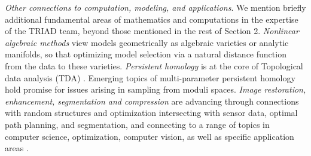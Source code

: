 \documentclass[12pt]{article}
\begin{document}


{\it Other connections to computation, modeling, and applications}.
We mention briefly additional fundamental areas of mathematics and computations in the expertise of the TRIAD team, beyond those mentioned in the rest of Section 2.  {\it Nonlinear algebraic methods} view
models geometrically as algebraic varieties or analytic manifolds, so that optimizing model selection via a natural distance function from the data to these varieties.
{\it Persistent homology} is at the core of Topological data analysis (TDA) \cite{carlsson2009topology,carlsson2009theory}.  Emerging topics of multi-parameter persistent homology  hold promise for issues arising in sampling from moduli spaces.
{\it Image restoration, enhancement, segmentation and compression} are advancing through connections with random structures and optimization intersecting with sensor data, optimal path planning, and segmentation, and connecting to a range of topics in computer science, optimization, computer vision, as well as specific application areas \cite{yashtini2016fast,sandberg2010unsupervised,ha2010image}.









\end{document}
